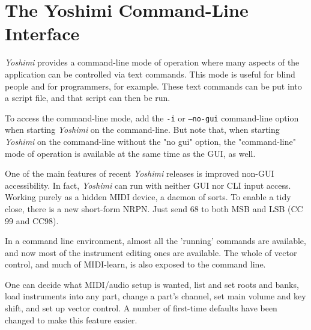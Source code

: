%
%
%

\section{The Yoshimi Command-Line Interface}
\label{sec:command_line}

   \textsl{Yoshimi} provides a command-line mode of operation
   where many aspects of the application can be controlled via text commands.
   This mode is useful for blind people and for programmers, for example.
   These text commands can be put into a script file, and that script can then
   be run.
   
   To access the command-line mode,
   add the \texttt{-i} or \texttt{--no-gui} command-line
   option when starting \textsl{Yoshimi} on the command-line.  But note that,
   when starting \textsl{Yoshimi} on the command-line without the "no gui"
   option, the "command-line" mode
   of operation is available at the same time as the GUI, as well.

   One of the main features of recent \textsl{Yoshimi} releases
   is improved non-GUI accessibility.  In fact,
   \textsl{Yoshimi} can run with neither GUI nor CLI input access. Working
   purely as a hidden MIDI device, a daemon of sorts. To enable a tidy close,
   there is a new short-form NRPN. Just send 68 to both MSB and LSB (CC 99 and
   CC98).

   In a command line environment, almost all the 'running' commands are
   available, and now most of the instrument editing ones are available.
   The whole of vector control, and much of MIDI-learn, is also exposed to the
   command line.

   One can decide what MIDI/audio setup is wanted, list and set roots and
   banks, load instruments into any part, change a part's channel, set main
   volume and key shift, and set up vector control.  A number of first-time
   defaults have been changed to make this feature easier.

